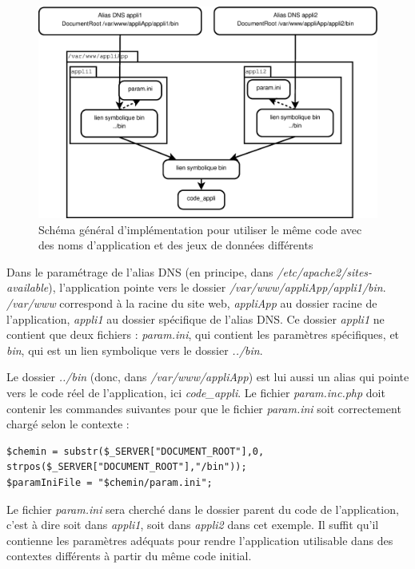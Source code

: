 \begin{figure}[H]
\includegraphics[width=\linewidth]{images/dnsmultiple}
\caption{\label{dnsmultipleschema}Schéma général d’implémentation pour utiliser le même code avec des noms d’application et des jeux de données différents}
\end{figure}

Dans le paramétrage de l’alias DNS (en principe, dans \textit{/etc/apache2/sites-available}), l’application pointe vers le dossier \textit{/var/www/appliApp/appli1/bin}. \textit{/var/www} correspond à la racine du site web, \textit{appliApp} au dossier racine de l’application, \textit{appli1} au dossier spécifique de l’alias DNS. Ce dossier \textit{appli1} ne contient que deux fichiers : \textit{param.ini}, qui contient les paramètres spécifiques, et \textit{bin}, qui est un lien symbolique vers le dossier \textit{../bin}.

Le dossier \textit{../bin} (donc, dans\textit{ /var/www/appliApp}) est lui aussi un alias qui pointe vers le code réel de l’application, ici \textit{code\_appli}. Le fichier \textit{param.inc.php} doit contenir les commandes suivantes pour que le fichier \textit{param.ini} soit correctement chargé selon le contexte :
\begin{lstlisting}
$chemin = substr($_SERVER["DOCUMENT_ROOT"],0, strpos($_SERVER["DOCUMENT_ROOT"],"/bin"));
$paramIniFile = "$chemin/param.ini";
\end{lstlisting}

Le fichier \textit{param.ini} sera cherché dans le dossier parent du code de l’application, c’est à dire soit dans \textit{appli1}, soit dans \textit{appli2} dans cet exemple. Il suffit qu’il contienne les paramètres adéquats pour rendre l’application utilisable dans des contextes différents à partir du même code initial.

